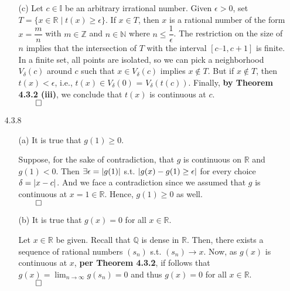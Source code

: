 \documentclass[11pt]{article}
\DeclarePairedDelimiter\abs{\lvert}{\rvert}%
\newcommand{\nats}{\mathbb{N}}
\newcommand{\reals}{\mathbb{R}}
\newcommand{\ints}{\mathbb{Z}}
\newcommand{\rats}{\mathbb{Q}}
\newcommand{\irrats}{\mathbb{I}}
\begin{document}
\begin{itemize}
\begin{itemize}
            \item[(c)]
                Let $c \in \irrats$ be an arbitrary irrational number.  Given
                $\epsilon > 0$, set $T = \{x \in \reals \mid t(x) \geq
                \epsilon\}$. If $x \in T$, then $x$ is a rational number of the
                form $x = \dfrac{m}{n}$ with $m \in \ints$ and $n \in \nats$
                where $n \leq \dfrac{1}{\epsilon}$. The restriction on the size
                of $n$ implies that the intersection of $T$ with the interval
                $[c – 1, c + 1]$ is finite. In a finite set, all points are
                isolated, so we can pick a neighborhood $V_\delta(c)$ around
                $c$ such that $x \in V_\delta(c)$ implies $x \notin T$. But if
                $x \notin T$, then $t(x) < \epsilon$, i.e., $t(x) \in
                V_\delta(0)$ = $V_\delta(t(c))$. Finally, \textbf{by Theorem
                4.3.2 (iii)}, we conclude that $t(x)$ is continuous at $c$.\\
                $\qed$
        \end{itemize}

    \item[4.3.8]
        \begin{itemize}
            \item[(a)]
                It is true that $g(1) \geq 0$.

                Suppose, for the sake of contradiction, that $g$ is continuous
                on $\reals$ and $g(1) < 0$. Then $\exists \epsilon =
                \abs{g(1)}$ s.t. $\abs{g(x) - g(1) \geq \epsilon}$ for every
                choice $\delta = \abs{x - c}$. And we face a contradiction
                since we assumed that $g$ is continuous at $x = 1 \in \reals$.
                Hence, $g(1) \geq 0$ as well.\\
                $\qed$

            \item[(b)]
                It is true that $g(x) = 0$ for all $x \in \reals$.

                Let $x \in \reals$ be given. Recall that $\rats$ is dense in
                $\reals$. Then, there exists a sequence of rational numbers
                $(s_n)$ s.t. $(s_n) \to x$. Now, as $g(x)$ is continuous at
                $x$, \textbf{per Theorem 4.3.2}, if follows that $g(x) =
                \lim_{n \to \infty} g(s_n) = 0$ and thus $g(x) = 0$ for all $x
                \in \reals$.\\
                $\qed$


\end{itemize}
\end{itemize}
\end{document}
